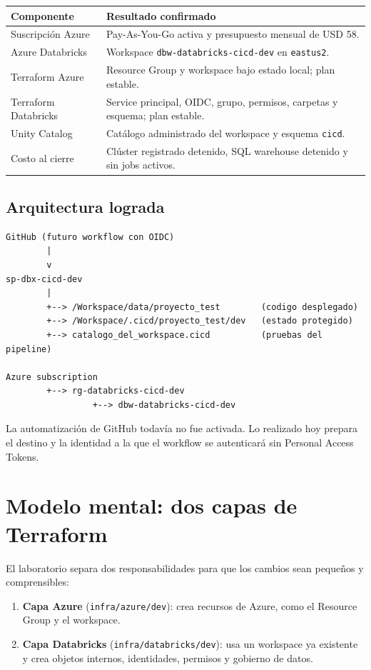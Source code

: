 \documentclass[11pt,a4paper]{article}
\begin{document}
\begin{tabularx}{\textwidth}{@{}p{}X@{}}
\toprule
\textbf{Componente} & \textbf{Resultado confirmado} \\
\midrule
Suscripción Azure & Pay-As-You-Go activa y presupuesto mensual de USD 58. \\
Azure Databricks & Workspace \texttt{dbw-databricks-cicd-dev} en \texttt{eastus2}. \\
Terraform Azure & Resource Group y workspace bajo estado local; plan estable. \\
Terraform Databricks & Service principal, OIDC, grupo, permisos, carpetas y esquema; plan estable. \\
Unity Catalog & Catálogo administrado del workspace y esquema \texttt{cicd}. \\
Costo al cierre & Clúster registrado detenido, SQL warehouse detenido y sin jobs activos. \\
\bottomrule
\end{tabularx}

\subsection{Arquitectura lograda}

\begin{lstlisting}
GitHub (futuro workflow con OIDC)
        |
        v
sp-dbx-cicd-dev
        |
        +--> /Workspace/data/proyecto_test        (codigo desplegado)
        +--> /Workspace/.cicd/proyecto_test/dev   (estado protegido)
        +--> catalogo_del_workspace.cicd          (pruebas del pipeline)

Azure subscription
        +--> rg-databricks-cicd-dev
                 +--> dbw-databricks-cicd-dev
\end{lstlisting}

La automatización de GitHub todavía no fue activada. Lo realizado hoy prepara el destino y la
identidad a la que el workflow se autenticará sin Personal Access Tokens.

\section{Modelo mental: dos capas de Terraform}

El laboratorio separa dos responsabilidades para que los cambios sean pequeños y comprensibles:

\begin{enumerate}
  \item \textbf{Capa Azure} (\texttt{infra/azure/dev}): crea recursos de Azure, como el Resource
  Group y el workspace.
  \item \textbf{Capa Databricks} (\texttt{infra/databricks/dev}): usa un workspace ya existente y
  crea objetos internos, identidades, permisos y gobierno de datos.
\end{enumerate}
\end{document}
